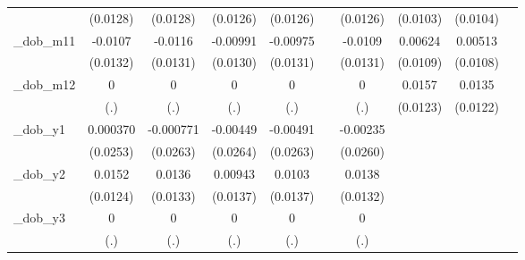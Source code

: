 \begin{table}[htbp]
\begin{tabular}{l*{9}{c}}
            &    (0.0128)         &    (0.0128)         &    (0.0126)         &    (0.0126)         &                     &    (0.0126)         &    (0.0103)         &    (0.0104)         &                     \\
[1em]
\_dob\_m11    &     -0.0107         &     -0.0116         &    -0.00991         &    -0.00975         &                     &     -0.0109         &     0.00624         &     0.00513         &                     \\
            &    (0.0132)         &    (0.0131)         &    (0.0130)         &    (0.0131)         &                     &    (0.0131)         &    (0.0109)         &    (0.0108)         &                     \\
[1em]
\_dob\_m12    &           0         &           0         &           0         &           0         &                     &           0         &      0.0157         &      0.0135         &                     \\
            &         (.)         &         (.)         &         (.)         &         (.)         &                     &         (.)         &    (0.0123)         &    (0.0122)         &                     \\
[1em]
\_dob\_y1     &    0.000370         &   -0.000771         &    -0.00449         &    -0.00491         &                     &    -0.00235         &                     &                     &                     \\
            &    (0.0253)         &    (0.0263)         &    (0.0264)         &    (0.0263)         &                     &    (0.0260)         &                     &                     &                     \\
[1em]
\_dob\_y2     &      0.0152         &      0.0136         &     0.00943         &      0.0103         &                     &      0.0138         &                     &                     &                     \\
            &    (0.0124)         &    (0.0133)         &    (0.0137)         &    (0.0137)         &                     &    (0.0132)         &                     &                     &                     \\
[1em]
\_dob\_y3     &           0         &           0         &           0         &           0         &                     &           0         &                     &                     &                     \\
            &         (.)         &         (.)         &         (.)         &         (.)         &                     &         (.)         &                     &                     &                     \\

\end{tabular}
\end{table}
